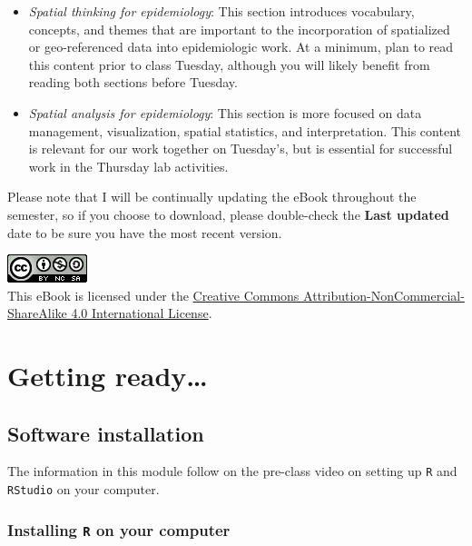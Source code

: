 \documentclass[
]{book}
\newcommand{\passthrough}[1]{#1}
\providecommand{\tightlist}{%
  \setlength{\itemsep}{0pt}\setlength{\parskip}{0pt}}
\begin{document}
\begin{itemize}
\tightlist
\item
  \emph{Spatial thinking for epidemiology}: This section introduces vocabulary, concepts, and themes that are important to the incorporation of spatialized or geo-referenced data into epidemiologic work. At a minimum, plan to read this content prior to class Tuesday, although you will likely benefit from reading both sections before Tuesday.
\item
  \emph{Spatial analysis for epidemiology}: This section is more focused on data management, visualization, spatial statistics, and interpretation. This content is relevant for our work together on Tuesday's, but is essential for successful work in the Thursday lab activities.
\end{itemize}

Please note that I will be continually updating the eBook throughout the semester, so if you choose to download, please double-check the \textbf{Last updated} date to be sure you have the most recent version.

\includegraphics{images/by-nc-sa.png}\\
This eBook is licensed under the \href{http://creativecommons.org/licenses/by-nc-sa/4.0/}{Creative Commons Attribution-NonCommercial-ShareAlike 4.0 International License}.

\hypertarget{part-getting-ready}{%
\part{Getting ready\ldots{}}\label{part-getting-ready}}

\hypertarget{software-installation}{%
\chapter*{Software installation}\label{software-installation}}

The information in this module follow on the pre-class video on setting up \passthrough{\lstinline!R!} and \passthrough{\lstinline!RStudio!} on your computer.

\hypertarget{installing-r-on-your-computer}{%
\section*{\texorpdfstring{Installing \texttt{R} on your computer}{Installing R on your computer}}\label{installing-r-on-your-computer}}
\end{document}
